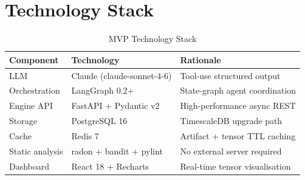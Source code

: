 \documentclass[manuscript,review,anonymous]{acmart}
\begin{document}
\section{Technology Stack}

\begin{table}[h]
  \caption{MVP Technology Stack}
  \label{tab:stack}
  \begin{tabular}{llp{4cm}}
    \toprule
    Component & Technology & Rationale \\
    \midrule
    LLM & Claude (claude-sonnet-4-6) & Tool-use structured output \\
    Orchestration & LangGraph 0.2+ & State-graph agent coordination \\
    Engine API & FastAPI + Pydantic v2 & High-performance async REST \\
    Storage & PostgreSQL 16 & TimescaleDB upgrade path \\
    Cache & Redis 7 & Artifact + tensor TTL caching \\
    Static analysis & radon + bandit + pylint & No external server required \\
    Dashboard & React 18 + Recharts & Real-time tensor visualisation \\
    \bottomrule
  \end{tabular}
\end{table}
\end{document}
